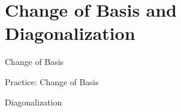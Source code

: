 \section{Change of Basis and Diagonalization}

\begin{frame}{Change of Basis}

\end{frame}

\begin{frame}{Practice: Change of Basis}

\end{frame}

\begin{frame}{Diagonalization}

\end{frame}